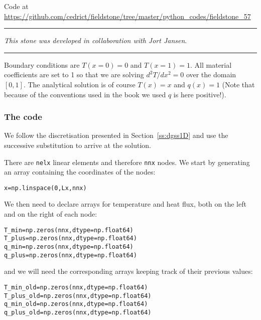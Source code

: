 

\begin{center}
Code at \url{https://github.com/cedrict/fieldstone/tree/master/python_codes/fieldstone_57}
\end{center}

\par\noindent\rule{\textwidth}{0.4pt}

{\sl This stone was developed in collaboration with Jort Jansen}. 

\par\noindent\rule{\textwidth}{0.4pt}


Boundary conditions are $T(x=0)=0$ and $T(x=1)=1$. All material coefficients are set to 1
so that we are solving $d^2T/dx^2=0$ over the domain $[0,1]$. The analytical solution is 
of course $T(x)=x$ and $q(x)=1$ (Note that because of the conventions used in the book 
we used $q$ is here positive!). 

\subsubsection*{The code}

We follow the discretisation presented in Section~\ref{ss:dgss1D} and use the 
successive substitution to arrive at the solution. 

There are {\tt nelx} linear elements and therefore {\tt nnx} nodes.
We start by generating an array containing the coordinates of the nodes:
\begin{lstlisting}
x=np.linspace(0,Lx,nnx)
\end{lstlisting}
We then need to declare arrays for temperature and heat flux, both on the left and on the right of 
each node:
\begin{lstlisting}
T_min=np.zeros(nnx,dtype=np.float64)       
T_plus=np.zeros(nnx,dtype=np.float64)      
q_min=np.zeros(nnx,dtype=np.float64)       
q_plus=np.zeros(nnx,dtype=np.float64)
\end{lstlisting}
and we will need the corresponding arrays keeping track of their previous values:
\begin{lstlisting}
T_min_old=np.zeros(nnx,dtype=np.float64)    
T_plus_old=np.zeros(nnx,dtype=np.float64)   
q_min_old=np.zeros(nnx,dtype=np.float64)    
q_plus_old=np.zeros(nnx,dtype=np.float64)
\end{lstlisting}

